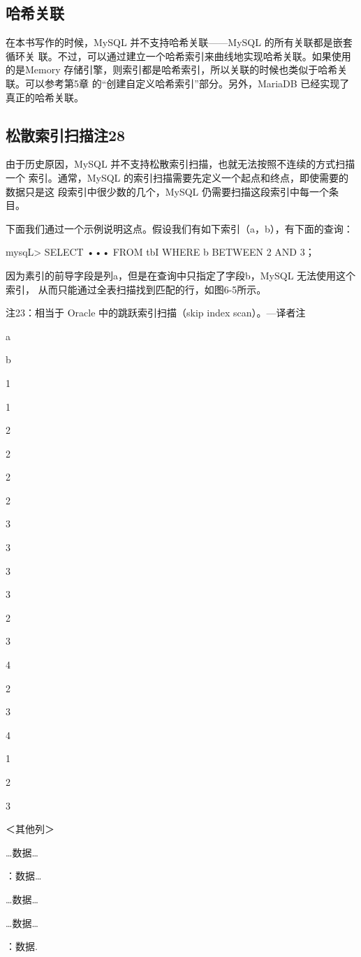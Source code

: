 \subsection{哈希关联}
在本书写作的时候，MySQL 并不支持哈希关联——MySQL 的所有关联都是嵌套循环关
联。不过，可以通过建立一个哈希索引来曲线地实现哈希关联。如果使用的是Memory
存储引擎，则索引都是哈希索引，所以关联的时候也类似于哈希关联。可以参考第5章
的“创建自定义哈希索引”部分。另外，MariaDB 已经实现了真正的哈希关联。

\subsection{松散索引扫描注28}
由于历史原因，MySQL 并不支持松散索引扫描，也就无法按照不连续的方式扫描一个
索引。通常，MySQL 的索引扫描需要先定义一个起点和终点，即使需要的数据只是这
段索引中很少数的几个，MySQL 仍需要扫描这段索引中每一个条目。

下面我们通过一个示例说明这点。假设我们有如下索引（a，b），有下面的查询：

mysqL> SELECT ••• FROM tbI WHERE b BETWEEN 2 AND 3；

因为素引的前导字段是列a，但是在查询中只指定了字段b，MySQL 无法使用这个索引，
从而只能通过全表扫描找到匹配的行，如图6-5所示。

注23：相当于 Oracle 中的跳跃索引扫描（skip index scan）。—译者注

a

b

1

1

2

2

2

2

3

3

3

3

2

3

4

2

3

4

1

2

3

＜其他列＞

…数据…

：数据…

…数据…

…数据…

：数据.

